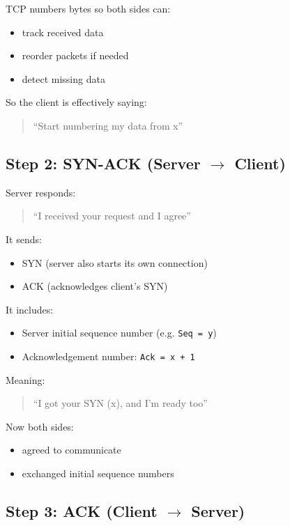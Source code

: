 TCP numbers bytes so both sides can:
\begin{itemize}
    \item track received data
    \item reorder packets if needed
    \item detect missing data
\end{itemize}

So the client is effectively saying:
\begin{quote}
“Start numbering my data from x”
\end{quote}

\subsection{Step 2: SYN-ACK (Server $\rightarrow$ Client)}

Server responds:

\begin{quote}
“I received your request and I agree”
\end{quote}

It sends:
\begin{itemize}
    \item SYN (server also starts its own connection)
    \item ACK (acknowledges client’s SYN)
\end{itemize}

It includes:
\begin{itemize}
    \item Server initial sequence number (e.g. \texttt{Seq = y})
    \item Acknowledgement number: \texttt{Ack = x + 1}
\end{itemize}

Meaning:
\begin{quote}
“I got your SYN (x), and I’m ready too”
\end{quote}

Now both sides:
\begin{itemize}
    \item agreed to communicate
    \item exchanged initial sequence numbers
\end{itemize}

\subsection{Step 3: ACK (Client $\rightarrow$ Server)}


